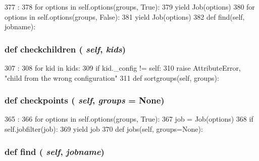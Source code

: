 \begin{DoxyCode}
377                                   :
378         for options in self.options(groups, True):
379             yield Job(options)
380         for options in self.options(groups, False):
381             yield Job(options)
382 
    def find(self, jobname):
\end{DoxyCode}
\hypertarget{classm5_1_1util_1_1jobfile_1_1Configuration_a610cc5c8afb94de9aad93bf28aa9b41d}{
\subsubsection[{checkchildren}]{\setlength{\rightskip}{0pt plus 5cm}def checkchildren ( {\em self}, \/   {\em kids})}}
\label{classm5_1_1util_1_1jobfile_1_1Configuration_a610cc5c8afb94de9aad93bf28aa9b41d}



\begin{DoxyCode}
307                                  :
308         for kid in kids:
309             if kid._config != self:
310                 raise AttributeError, "child from the wrong configuration"
311 
    def sortgroups(self, groups):
\end{DoxyCode}
\hypertarget{classm5_1_1util_1_1jobfile_1_1Configuration_a966d8a5d601c4ec01a6fabd91a636095}{
\subsubsection[{checkpoints}]{\setlength{\rightskip}{0pt plus 5cm}def checkpoints ( {\em self}, \/   {\em groups} = {\ttfamily None})}}
\label{classm5_1_1util_1_1jobfile_1_1Configuration_a966d8a5d601c4ec01a6fabd91a636095}



\begin{DoxyCode}
365                                       :
366         for options in self.options(groups, True):
367             job = Job(options)
368             if self.jobfilter(job):
369                 yield job
370 
    def jobs(self, groups=None):
\end{DoxyCode}
\hypertarget{classm5_1_1util_1_1jobfile_1_1Configuration_a01f90f57b7acd55e177611f5d0f7df23}{
\subsubsection[{find}]{\setlength{\rightskip}{0pt plus 5cm}def find ( {\em self}, \/   {\em jobname})}}
\label{classm5_1_1util_1_1jobfile_1_1Configuration_a01f90f57b7acd55e177611f5d0f7df23}



